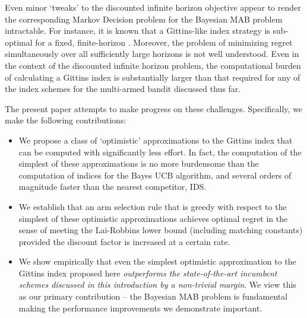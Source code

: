 Even minor `tweaks' to the discounted infinite horizon objective appear to render the corresponding Markov Decision problem for the Bayesian MAB problem intractable. For instance, it is known that a Gittins-like index strategy is sub-optimal for a fixed, finite-horizon \citep{berry1985bandit}. Moreover, the problem of minimizing regret simultaneously over all sufficiently large horizons is not well understood.
\newline
\newline
{}Even in the context of the discounted infinite horizon problem, the computational burden of calculating a Gittins index is substantially larger than that required for any of the index schemes for the multi-armed bandit discussed thus far. 

The present paper attempts to make progress on these challenges. Specifically, we make the following contributions:
\begin{itemize}
	\item We propose a class of `optimistic' approximations to the Gittins index that can be computed with significantly less effort. In fact, the computation of the simplest of these approximations is no more burdensome than the computation of indices for the Bayes UCB algorithm, and several orders of magnitude faster than the nearest competitor, IDS. 
	\item We establish that an arm selection rule that is greedy with respect to the simplest of these optimistic approximations achieves optimal regret in the sense of meeting the Lai-Robbins lower bound (including matching constants) provided the discount factor is increased at a certain rate.
	\item We show empirically that even the simplest optimistic approximation to the Gittins index proposed here {\em outperforms the state-of-the-art incumbent schemes discussed in this introduction by a non-trivial margin}. We view this as our primary contribution -- the Bayesian MAB problem is fundamental making the performance improvements we demonstrate important.  
\end{itemize}

